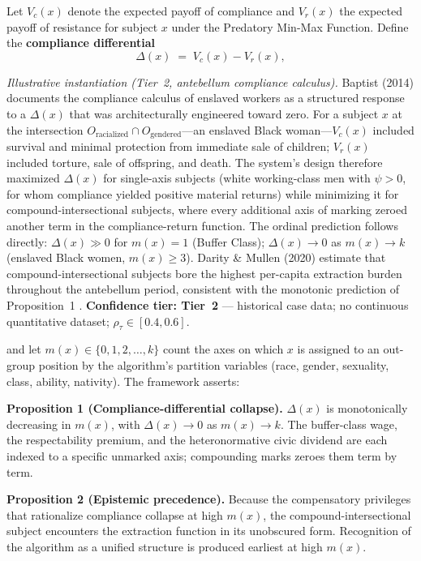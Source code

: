 \begin{definition}
\label{def:early_detection}
Let $V_c(x)$ denote the expected payoff of compliance and $V_r(x)$ the expected payoff of resistance for subject $x$ under the Predatory Min-Max Function. Define the \textbf{compliance differential}
\begin{equation}\label{eq:5.1-compliance-differential}
\Delta(x) \;=\; V_c(x) - V_r(x),
\end{equation}

\noindent\textit{Illustrative instantiation (Tier~2, antebellum compliance calculus).} Baptist (2014) documents the compliance calculus of enslaved workers as a structured response to a $\Delta(x)$ that was architecturally engineered toward zero. For a subject $x$ at the intersection $O_{\text{racialized}} \cap O_{\text{gendered}}$---an enslaved Black woman---$V_c(x)$ included survival and minimal protection from immediate sale of children; $V_r(x)$ included torture, sale of offspring, and death. The system's design therefore maximized $\Delta(x)$ for single-axis subjects (white working-class men with $\psi > 0$, for whom compliance yielded positive material returns) while minimizing it for compound-intersectional subjects, where every additional axis of marking zeroed another term in the compliance-return function. The ordinal prediction follows directly: $\Delta(x) \gg 0$ for $m(x) = 1$ (Buffer Class); $\Delta(x) \to 0$ as $m(x) \to k$ (enslaved Black women, $m(x) \geq 3$). Darity \& Mullen (2020) estimate that compound-intersectional subjects bore the highest per-capita extraction burden throughout the antebellum period, consistent with the monotonic prediction of Proposition~1 \cite{baptist, darity_mullen}. \textbf{Confidence tier: Tier~2} --- historical case data; no continuous quantitative dataset; $\rho_\tau \in [0.4, 0.6]$.

and let $m(x) \in \{0, 1, 2, \ldots, k\}$ count the axes on which $x$ is assigned to an out-group position by the algorithm's partition variables (race, gender, sexuality, class, ability, nativity). The framework asserts:

\medskip
\textbf{Proposition 1 (Compliance-differential collapse).}
$\Delta(x)$ is monotonically decreasing in $m(x)$, with $\Delta(x) \to 0$ as $m(x) \to k$. The buffer-class wage, the respectability premium, and the heteronormative civic dividend are each indexed to a specific unmarked axis; compounding marks zeroes them term by term.

\medskip
\textbf{Proposition 2 (Epistemic precedence).}
Because the compensatory privileges that rationalize compliance collapse at high $m(x)$, the compound-intersectional subject encounters the extraction function in its unobscured form. Recognition of the algorithm as a unified structure is produced earliest at high $m(x)$.


\end{definition}
